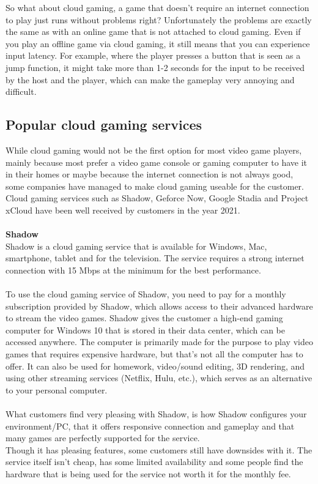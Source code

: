 So what about cloud gaming, a game that doesn't require an internet connection to play just runs without problems right? Unfortunately the problems are exactly the same as with an online game that is not attached to cloud gaming. Even if you play an offline game via cloud gaming, it still means that you can experience input latency. For example, where the player presses a button that is seen as a jump function, it might take more than 1-2 seconds for the input to be received by the host and the player, which can make the gameplay very annoying and difficult.
\subsection{Popular cloud gaming services}
While cloud gaming would not be the first option for most video game players, mainly because most prefer a video game console or gaming computer to have it in their homes or maybe because the internet connection is not always good, some companies have managed to make cloud gaming useable for the customer. Cloud gaming services such as Shadow, Geforce Now, Google Stadia and Project xCloud have been well received by customers in the year 2021.\\\\
\textbf{Shadow}\\
Shadow is a cloud gaming service that is available for Windows, Mac, smartphone, tablet and for the television. The service requires a strong internet connection with 15 Mbps at the minimum for the best performance.\\\\
To use the cloud gaming service of Shadow, you need to pay for a monthly subscription provided by Shadow, which allows access to their advanced hardware to stream the video games. Shadow gives the customer a high-end gaming computer for Windows 10 that is stored in their data center, which can be accessed anywhere. The computer is primarily made for the purpose to play video games that requires expensive hardware, but that's not all the computer has to offer. It can also be used for homework, video/sound editing, 3D rendering, and using other streaming services (Netflix, Hulu, etc.), which serves as an alternative to your personal computer.\\\\
What customers find very pleasing with Shadow, is how Shadow configures your environment/PC, that it offers responsive connection and gameplay and that many games are perfectly supported for the service.\\Though it has pleasing features, some customers still have downsides with it. The service itself isn't cheap, has some limited availability and some people find the hardware that is being used for the service not worth it for the monthly fee.\\\\
